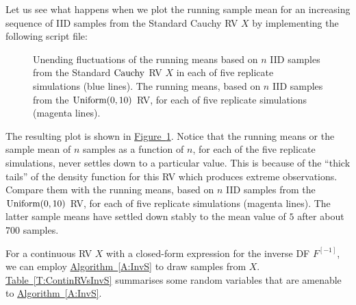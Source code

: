  \begin{labwork}\label{LW:RunningMeanCauchy}
Let us see what happens when we plot the running sample mean for an increasing sequence of IID samples from the Standard Cauchy RV $X$ by implementing the following script file:


\begin{figure}[htpb]
\caption{Unending fluctuations of  the running means based on $n$ IID samples from the Standard $\mbox{{\rm Cauchy}}$ RV $X$ in each of five replicate simulations (blue lines).  The running means, based on $n$ IID samples from the $\mbox{{\rm Uniform}}(0,10)$ RV, for each of five replicate simulations (magenta lines). \label{F:plot5RunningMeansStandardcauchyUnif010}}
\centering   {}
\end{figure}

The resulting plot is shown in \hyperref[F:plot5RunningMeansStandardcauchyUnif010]{Figure~\ref*{F:plot5RunningMeansStandardcauchyUnif010}}.  Notice that the running means or the sample mean of $n$ samples as  a function of $n$, for each of the five replicate simulations, never settles down to a particular value.  This is because of the ``thick tails'' of the density function for this RV which produces extreme observations.  Compare them with the running means, based on $n$ IID samples from the $\mbox{{\rm Uniform}}(0,10)$ RV, for each of five replicate simulations (magenta lines).  The latter sample means have settled down stably to the mean value of $5$ after about $700$ samples.
\end{labwork}

For a continuous RV $X$ with a closed-form expression for the inverse DF $F^{[-1]}$, we can employ \hyperref[A:InvS]{Algorithm~\ref*{A:InvS}} to draw samples from $X$.  \hyperref[T:ContinRVsInvS]{Table~\ref*{T:ContinRVsInvS}}  summarises some random variables that are amenable to \hyperref[A:InvS]{Algorithm~\ref*{A:InvS}}.

